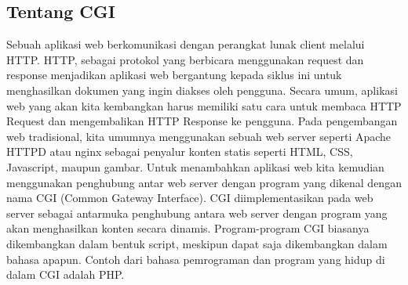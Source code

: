 \subsection{Tentang CGI}
Sebuah aplikasi web berkomunikasi dengan perangkat lunak client melalui HTTP. HTTP, sebagai protokol yang berbicara menggunakan request dan response menjadikan aplikasi web bergantung kepada siklus ini untuk menghasilkan dokumen yang ingin diakses oleh pengguna. Secara umum, aplikasi web yang akan kita kembangkan harus memiliki satu cara untuk membaca HTTP Request dan mengembalikan HTTP Response ke pengguna. 
	Pada pengembangan web tradisional, kita umumnya menggunakan sebuah web server seperti Apache HTTPD atau nginx sebagai penyalur konten statis seperti HTML, CSS, Javascript, maupun gambar. Untuk menambahkan aplikasi web kita kemudian menggunakan penghubung antar web server dengan program yang dikenal dengan nama CGI (Common Gateway Interface). 
	CGI diimplementasikan pada web server sebagai antarmuka penghubung antara web server dengan program yang akan menghasilkan konten secara dinamis. Program-program CGI biasanya dikembangkan dalam bentuk script, meskipun dapat saja dikembangkan dalam bahasa apapun. Contoh dari bahasa pemrograman dan program yang hidup di dalam CGI adalah PHP.

